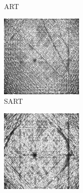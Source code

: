 \documentclass[journal]{IEEEtran}
\begin{document}
\begin{figure}[!h]
\begin{subfigure}[b]{0.24\linewidth}
        \caption{ART}
     \end{subfigure}
    \begin{subfigure}[b]{0.24\linewidth}
        \includegraphics[width=\textwidth]{../images/potato/post_tci/comparison/weightsIm_sart30.png}
        \caption{SART}
     \end{subfigure}
    \begin{subfigure}[b]{0.24\linewidth}
        \includegraphics[width=\textwidth]{../images/potato/post_tci/comparison/weightsIm_sirt30.png}

\end{subfigure}
\end{figure}
\end{document}
